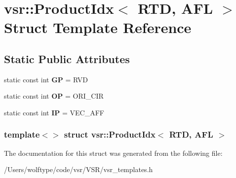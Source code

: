 \hypertarget{structvsr_1_1_product_idx_3_01_r_t_d_00_01_a_f_l_01_4}{\section{vsr\-:\-:Product\-Idx$<$ R\-T\-D, A\-F\-L $>$ Struct Template Reference}
\label{structvsr_1_1_product_idx_3_01_r_t_d_00_01_a_f_l_01_4}
}
\subsection*{Static Public Attributes}
\begin{DoxyCompactItemize}
\item 
\hypertarget{structvsr_1_1_product_idx_3_01_r_t_d_00_01_a_f_l_01_4_a7ef0553c96a471adba7b5170309fbfe7}{static const int {\bfseries G\-P} = R\-V\-D}\label{structvsr_1_1_product_idx_3_01_r_t_d_00_01_a_f_l_01_4_a7ef0553c96a471adba7b5170309fbfe7}

\item 
\hypertarget{structvsr_1_1_product_idx_3_01_r_t_d_00_01_a_f_l_01_4_a20b267d99323f33883416e306020fae5}{static const int {\bfseries O\-P} = O\-R\-I\-\_\-\-C\-I\-R}\label{structvsr_1_1_product_idx_3_01_r_t_d_00_01_a_f_l_01_4_a20b267d99323f33883416e306020fae5}

\item 
\hypertarget{structvsr_1_1_product_idx_3_01_r_t_d_00_01_a_f_l_01_4_a94dbcb0209fd97e42bb6c43ef3b9aaa6}{static const int {\bfseries I\-P} = V\-E\-C\-\_\-\-A\-F\-F}\label{structvsr_1_1_product_idx_3_01_r_t_d_00_01_a_f_l_01_4_a94dbcb0209fd97e42bb6c43ef3b9aaa6}

\end{DoxyCompactItemize}
\subsubsection*{template$<$$>$ struct vsr\-::\-Product\-Idx$<$ R\-T\-D, A\-F\-L $>$}



The documentation for this struct was generated from the following file\-:\begin{DoxyCompactItemize}
\item 
/\-Users/wolftype/code/vsr/\-V\-S\-R/vsr\-\_\-templates.\-h\end{DoxyCompactItemize}
